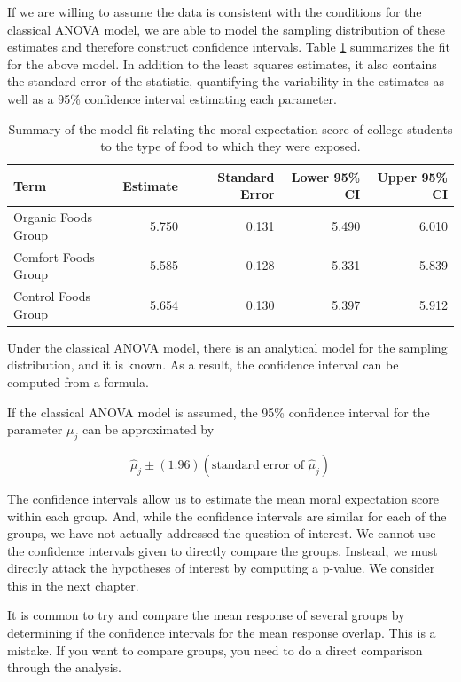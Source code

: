 \documentclass[]{book}
\theoremstyle{plain}
\theoremstyle{mydefn}
\theoremstyle{myexmpl}
\theoremstyle{remark}
\let\BeginKnitrBlock\begin \let\EndKnitrBlock\end
\let\BeginKnitrBlock\begin \let\EndKnitrBlock\end
\begin{document}
If we are willing to assume the data is consistent with the conditions
for the classical ANOVA model, we are able to model the sampling
distribution of these estimates and therefore construct confidence
intervals. Table \ref{tab:anovamodel-summary} summarizes the fit for the
above model. In addition to the least squares estimates, it also
contains the standard error of the statistic, quantifying the
variability in the estimates as well as a 95\% confidence interval
estimating each parameter.

\begin{table}

\caption{\label{tab:anovamodel-summary}Summary of the model fit relating the moral expectation score of college students to the type of food to which they were exposed.}
\centering
\begin{tabular}[t]{l|r|r|r|r}
\hline
Term & Estimate & Standard Error & Lower 95\% CI & Upper 95\% CI\\
\hline
Organic Foods Group & 5.750 & 0.131 & 5.490 & 6.010\\
\hline
Comfort Foods Group & 5.585 & 0.128 & 5.331 & 5.839\\
\hline
Control Foods Group & 5.654 & 0.130 & 5.397 & 5.912\\
\hline
\end{tabular}
\end{table}

Under the classical ANOVA model, there is an analytical model for the
sampling distribution, and it is known. As a result, the confidence
interval can be computed from a formula.

\BeginKnitrBlock{rmdtip}
If the classical ANOVA model is assumed, the 95\% confidence interval
for the parameter \(\mu_j\) can be approximated by

\[\widehat{\mu}_j \pm (1.96)\left(\text{standard error of } \widehat{\mu}_j\right)\]
\EndKnitrBlock{rmdtip}

The confidence intervals allow us to estimate the mean moral expectation
score within each group. And, while the confidence intervals are similar
for each of the groups, we have not actually addressed the question of
interest. We cannot use the confidence intervals given to directly
compare the groups. Instead, we must directly attack the hypotheses of
interest by computing a p-value. We consider this in the next chapter.

\BeginKnitrBlock{rmdtip}
It is common to try and compare the mean response of several groups by
determining if the confidence intervals for the mean response overlap.
This is a mistake. If you want to compare groups, you need to do a
direct comparison through the analysis.
\EndKnitrBlock{rmdtip}
\end{document}
